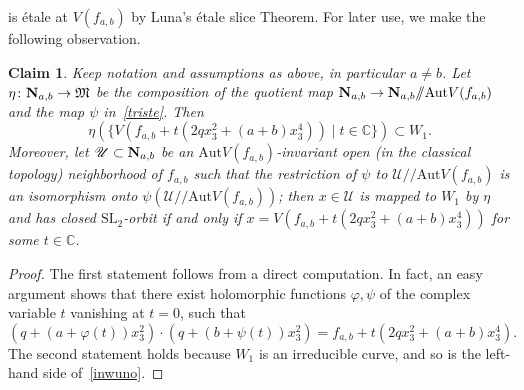 \documentclass[11pt]{amsart}
\numberwithin{equation}{section}
\theoremstyle{plain}
\newtheorem{claim}[theorem]{Claim}
\theoremstyle{remark}
\theoremstyle{definition}
\newcommand{\Aut}{\mathrm{Aut}}
\newcommand{\SL}{\mathrm{SL}}
\newcommand{\gquot}{/\!\!/}
\newcommand{\CC}{{\mathbb C}}
\newcommand{\cU}{{\mathscr U}}
\newcommand{\gM}{\mathfrak{M}}
\begin{document}
%
 is \'etale at $V(f_{a,b})$ by Luna's \'etale slice Theorem. For later use, we make the following observation.
%
\begin{claim}\label{clm:normstrat}
%
Keep notation and assumptions as above, in particular $a\not=b$. Let $\eta\colon {\bf N}_{a,b}\to \gM$ be the composition of the quotient map ${\bf N}_{a,b}\to {\bf N}_{a,b}\gquot  \Aut V(f_{a,b})$ and the map $\psi$ in~\eqref{triste}. Then
%
\begin{equation}\label{inwuno}
%
\eta(\{V(f_{a,b}+t(2q x_3^2+(a+b)x_3^4)) \mid t\in\CC\})\subset W_1.
%
\end{equation}
%
Moreover, let $\cU\subset {\bf N}_{a,b}$ be an $\Aut V(f_{a,b})$-invariant open (in the classical topology)  neighborhood of $f_{a,b}$ such that the restriction of $\psi$ to 
$\cU\gquot  \Aut V(f_{a,b})$ is an isomorphism onto $\psi(\cU\gquot  \Aut V(f_{a,b}))$; then $x\in\cU$ is mapped to $W_1$ by $\eta$ and has closed $\SL_2$-orbit if and only if 
$x=V(f_{a,b}+t( 2q x_3^2+(a+b)x_3^4))$ for some $t\in\CC$.
%
\end{claim}
%
%
\begin{proof}
%
The first statement follows from a direct computation. In fact, an easy argument shows that there exist holomorphic functions $\varphi,\psi$ of the complex variable $t$ vanishing at $t=0$, such that 
%
$$(q+(a+\varphi(t)) x_3^2)\cdot (q+(b+\psi(t)) x_3^2)=f_{a,b}+t(2q x_3^2+(a+b)x_3^4).$$
%
The second statement holds because $W_1$ is an irreducible curve, and so is the left-hand side of~\eqref{inwuno}.
%
\end{proof}
%
%
\end{document}
